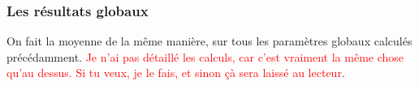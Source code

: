     \subsubsection{Les résultats globaux} 
        On fait la moyenne de la même manière, sur tous les paramètres globaux calculés précédamment.
        \textcolor{red}{Je n'ai pas détaillé les calculs, car c'est vraiment la même chose qu'au dessus. Si tu veux, je le fais, et sinon çà sera laissé au lecteur}.
